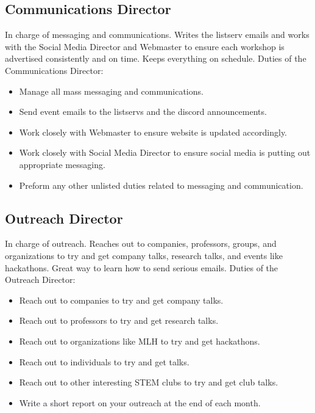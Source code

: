 \documentclass{article}
\begin{document}
\subsection{Communications Director}
In charge of messaging and communications. Writes the listserv emails and works with the Social Media Director and Webmaster to ensure each workshop is advertised consistently and on time. Keeps everything on schedule.
\newline
\newline
Duties of the Communications Director:
\begin{itemize}
    \item Manage all mass messaging and communications.
    \item Send event emails to the listservs and the discord announcements.
    \item Work closely with Webmaster to ensure website is updated accordingly. 
    \item Work closely with Social Media Director to ensure social media is putting out appropriate messaging.
    \item Preform any other unlisted duties related to messaging and communication. 
\end{itemize}
\subsection{Outreach Director}
In charge of outreach. Reaches out to companies, professors, groups, and organizations to try and get company talks, research talks, and events like hackathons. Great way to learn how to send serious emails.
\newline
\newline
Duties of the Outreach Director:
\begin{itemize}
    \item Reach out to companies to try and get company talks. 
    \item Reach out to professors to try and get research talks.
    \item Reach out to organizations like MLH to try and get hackathons.
    \item Reach out to individuals to try and get talks.
    \item Reach out to other interesting STEM clubs to try and get club talks.
    \item Write a short report on your outreach at the end of each month.
\end{itemize}
\newpage
\end{document}
